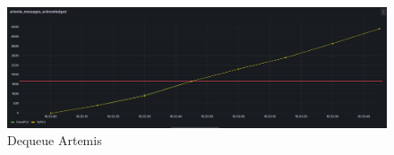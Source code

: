 \begin{figure}[h!]
  \centering
  \includegraphics[width=.95\textwidth]{img/artemis-dequeue-count.png}
  \caption{\label{fig:artemis_dequeue_count}Dequeue Artemis}
\end{figure}








